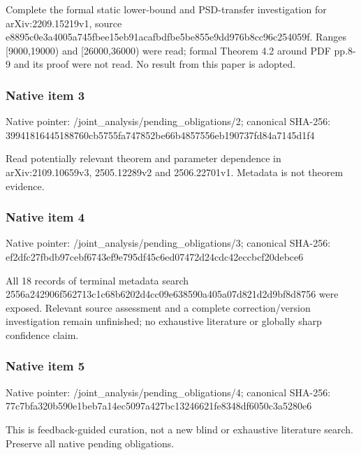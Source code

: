 \documentclass[10pt,a4paper]{article}
\begin{document}
\begingroup\raggedright\sloppy Complete the formal static lower-bound and PSD-transfer investigation for arXiv:\allowbreak{}2209.15219v1,\allowbreak{} source e8895c0e3a4005a745fbee15eb91acafbdfbe5be855e9dd976b8cc96c254059f. Ranges [9000,\allowbreak{}19000) and [26000,\allowbreak{}36000) were read;\allowbreak{} formal Theorem 4.2 around PDF pp.8-9 and its proof were not read. No result from this paper is adopted.\par\endgroup

\subsubsection{Native item 3}
Native pointer: /joint\_\allowbreak{}analysis/pending\_\allowbreak{}obligations/2; canonical SHA-256: 39941816445188760cb5755fa747852be66b4857556eb190737fd84a7145d1f4

\begingroup\raggedright\sloppy Read potentially relevant theorem and parameter dependence in arXiv:\allowbreak{}2109.10659v3,\allowbreak{} 2505.12289v2 and 2506.22701v1. Metadata is not theorem evidence.\par\endgroup

\subsubsection{Native item 4}
Native pointer: /joint\_\allowbreak{}analysis/pending\_\allowbreak{}obligations/3; canonical SHA-256: ef2dfc27fbdb97cebf6743ef9e795df45c6ed07472d24cdc42eccbcf20debce6

\begingroup\raggedright\sloppy All 18 records of terminal metadata search 2556a242906f562713c1c68b6202d4cc09e638590a405a07d821d2d9bf8d8756 were exposed. Relevant source assessment and a complete correction/\allowbreak{}version investigation remain unfinished;\allowbreak{} no exhaustive literature or globally sharp confidence claim.\par\endgroup

\subsubsection{Native item 5}
Native pointer: /joint\_\allowbreak{}analysis/pending\_\allowbreak{}obligations/4; canonical SHA-256: 77c7bfa320b590e1beb7a14ec5097a427bc13246621fe8348df6050c3a5280e6

\begingroup\raggedright\sloppy This is feedback-guided curation,\allowbreak{} not a new blind or exhaustive literature search. Preserve all native pending obligations.\par\endgroup
\end{document}
